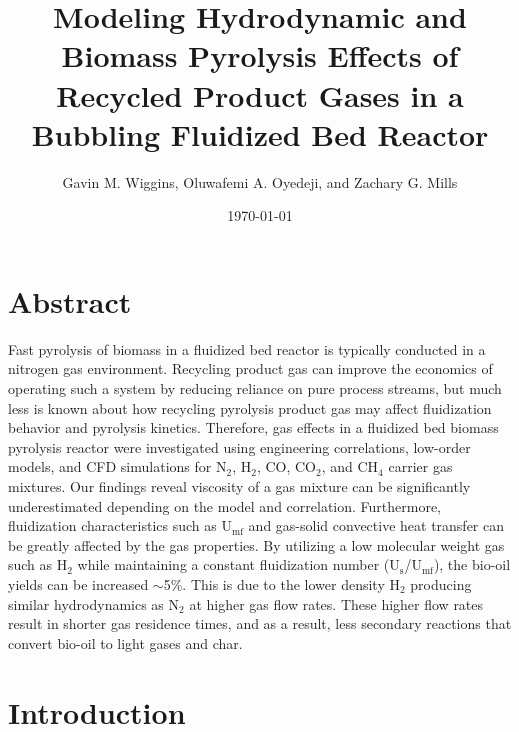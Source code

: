 \documentclass{article}
\title{Modeling Hydrodynamic and Biomass Pyrolysis Effects of Recycled Product Gases in a Bubbling Fluidized Bed Reactor}
\author{Gavin M. Wiggins, Oluwafemi A. Oyedeji, and Zachary G. Mills}
\date{\today}
\begin{document}
\maketitle


\section*{Abstract}

Fast pyrolysis of biomass in a fluidized bed reactor is typically conducted in a nitrogen gas environment. Recycling product gas can improve the economics of operating such a system by reducing reliance on pure process streams, but much less is known about how recycling pyrolysis product gas may affect fluidization behavior and pyrolysis kinetics. Therefore, gas effects in a fluidized bed biomass pyrolysis reactor were investigated using engineering correlations, low-order models, and CFD simulations for N$_2$, H$_2$, CO, CO$_2$, and CH$_4$ carrier gas mixtures. Our findings reveal viscosity of a gas mixture can be significantly underestimated depending on the model and correlation. Furthermore, fluidization characteristics such as U$_\textrm{mf}$ and gas-solid convective heat transfer can be greatly affected by the gas properties. By utilizing a low molecular weight gas such as H$_2$ while maintaining a constant fluidization number (U$_\text{s}$/U$_\text{mf}$), the bio-oil yields can be increased $\sim$5\%. This is due to the lower density H$_2$ producing similar hydrodynamics as N$_2$ at higher gas flow rates. These higher flow rates result in shorter gas residence times, and as a result, less secondary reactions that convert bio-oil to light gases and char.


\section{Introduction}
\end{document}
